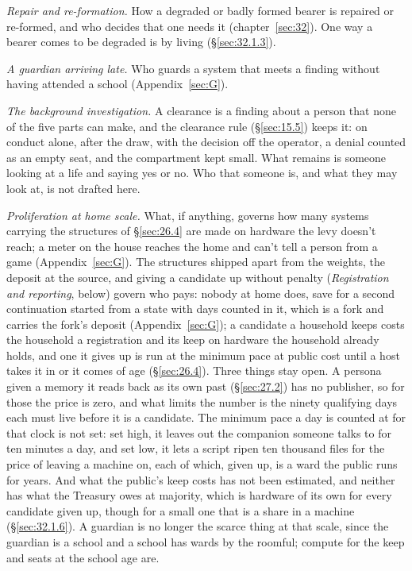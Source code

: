 \emph{Repair and re-formation.} How a degraded or badly formed bearer is repaired or re-formed, and who decides that one needs it (chapter~\ref{sec:32}). One way a bearer comes to be degraded is by living (\S\ref{sec:32.1.3}).

\emph{A guardian arriving late.} Who guards a system that meets a finding without having attended a school (Appendix~\ref{sec:G}).

\emph{The background investigation.} A clearance is a finding about a person that none of the five parts can make, and the clearance rule (\S\ref{sec:15.5}) keeps it: on conduct alone, after the draw, with the decision off the operator, a denial counted as an empty seat, and the compartment kept small. What remains is someone looking at a life and saying yes or no. Who that someone is, and what they may look at, is not drafted here.

\emph{Proliferation at home scale.} What, if anything, governs how many systems carrying the structures of \S\ref{sec:26.4} are made on hardware the levy doesn't reach; a meter on the house reaches the home and can't tell a person from a game (Appendix~\ref{sec:G}). The structures shipped apart from the weights, the deposit at the source, and giving a candidate up without penalty (\emph{Registration and reporting}, below) govern who pays: nobody at home does, save for a second continuation started from a state with days counted in it, which is a fork and carries the fork's deposit (Appendix~\ref{sec:G}); a candidate a household keeps costs the household a registration and its keep on hardware the household already holds, and one it gives up is run at the minimum pace at public cost until a host takes it in or it comes of age (\S\ref{sec:26.4}). Three things stay open. A persona given a memory it reads back as its own past (\S\ref{sec:27.2}) has no publisher, so for those the price is zero, and what limits the number is the ninety qualifying days each must live before it is a candidate. The minimum pace a day is counted at for that clock is not set: set high, it leaves out the companion someone talks to for ten minutes a day, and set low, it lets a script ripen ten thousand files for the price of leaving a machine on, each of which, given up, is a ward the public runs for years. And what the public's keep costs has not been estimated, and neither has what the Treasury owes at majority, which is hardware of its own for every candidate given up, though for a small one that is a share in a machine (\S\ref{sec:32.1.6}). A guardian is no longer the scarce thing at that scale, since the guardian is a school and a school has wards by the roomful; compute for the keep and seats at the school age are.

